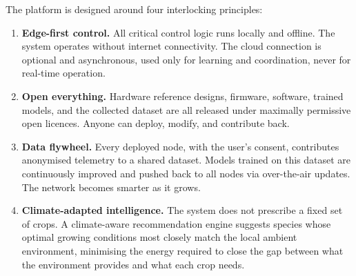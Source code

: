 The platform is designed around four interlocking principles:

\begin{enumerate}
  \item \textbf{Edge-first control.} All critical control logic runs locally and offline. The system operates without internet connectivity. The cloud connection is optional and asynchronous, used only for learning and coordination, never for real-time operation.

  \item \textbf{Open everything.} Hardware reference designs, firmware, software, trained models, and the collected dataset are all released under maximally permissive open licences. Anyone can deploy, modify, and contribute back.

  \item \textbf{Data flywheel.} Every deployed node, with the user's consent, contributes anonymised telemetry to a shared dataset. Models trained on this dataset are continuously improved and pushed back to all nodes via over-the-air updates. The network becomes smarter as it grows.

  \item \textbf{Climate-adapted intelligence.} The system does not prescribe a fixed set of crops. A climate-aware recommendation engine suggests species whose optimal growing conditions most closely match the local ambient environment, minimising the energy required to close the gap between what the environment provides and what each crop needs.
\end{enumerate}